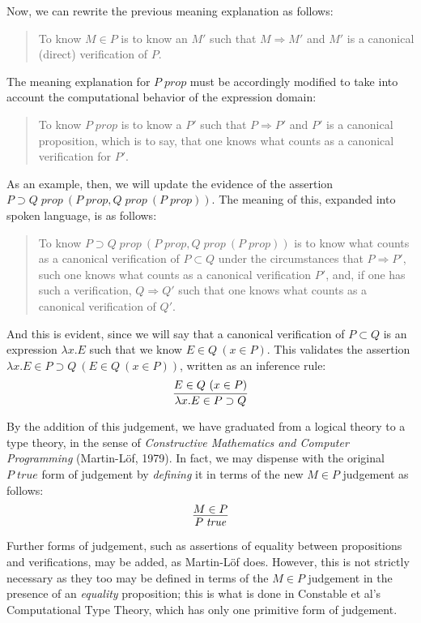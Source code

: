 \documentclass{amsart}
\theoremstyle{definition}
\theoremstyle{remark}
\numberwithin{equation}{section}
\newcommand\isprop[1]{\ensuremath{#1\;\mathit{prop}}}
\newcommand\istrue[1]{\ensuremath{#1\;\mathit{true}}}
\newcommand\hyp[2]{\ensuremath{#1\ (#2)}}
\newcommand\ver[2]{\ensuremath{#1\in#2}}
\newcommand\reduce[2]{\ensuremath{#1\Rightarrow#2}}
\begin{document}
Now, we can rewrite the previous meaning explanation as follows:
\begin{quote}
  To know \ver{M}{P} is to know an $M'$ such that \reduce{M}{M'} and $M'$ is a
  canonical (direct) verification of $P$.
\end{quote}

The meaning explanation for \isprop{P} must be accordingly modified to take
into account the computational behavior of the expression domain:
\begin{quote}
  To know \isprop{P} is to know a $P'$ such that \reduce{P}{P'} and $P'$ is a
  canonical proposition, which is to say, that one knows what counts as a
  canonical verification for $P'$.
\end{quote}

As an example, then, we will update the evidence of the assertion
\hyp{\isprop{P\supset Q}}{\isprop{P},\hyp{\isprop{Q}}{\isprop{P}}}. The meaning
of this, expanded into spoken language, is as follows:
\begin{quote}
  To know \hyp{\isprop{P\supset Q}}{\isprop{P},\hyp{\isprop{Q}}{\isprop{P}}} is
  to know what counts as a canonical verification of $P\subset Q$ under
  the circumstances that \reduce{P}{P'}, such one knows what counts as a
  canonical verification $P'$, and, if one has such a verification,
  \reduce{Q}{Q'} such that one knows what counts as a canonical verification of
  $Q'$.
\end{quote}

And this is evident, since we will say that a canonical verification of
$P\subset Q$ is an expression $\lambda x. E$ such that we know
\hyp{\ver{E}{Q}}{\ver{x}{P}}. This validates the assertion \hyp{\ver{\lambda
x.E}{P\supset Q}}{\hyp{\ver{E}{Q}}{\ver{x}{P}}}, written as an inference rule:
\[
  \infer{
    \ver{\lambda x.E}{P\supset Q}
  }{
    \hyp{\ver{E}{Q}}{\ver{x}{P}}
  }
\]

By the addition of this judgement, we have graduated from a logical theory to a
type theory, in the sense of \emph{Constructive Mathematics and Computer
Programming} (Martin-L\"of, 1979). In fact, we may dispense with the original
\istrue{P} form of judgement by \emph{defining} it in terms of the new
\ver{M}{P} judgement as follows:
\[
  \infer{
    \istrue{P}
  }{
    \ver{M}{P}
  }
\]

Further forms of judgement, such as assertions of equality between propositions
and verifications, may be added, as Martin-L\"of does. However, this is not
strictly necessary as they too may be defined in terms of the $\ver{M}{P}$
judgement in the presence of an \emph{equality} proposition; this is what is
done in Constable et al's Computational Type Theory, which has only one
primitive form of judgement.
\end{document}
